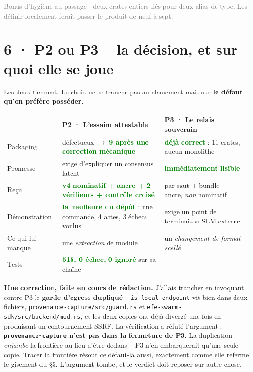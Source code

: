 \documentclass[10pt]{article}
\newcommand{\best}[1]{\textcolor{green}{\textbf{#1}}}
\newcommand{\sz}[1]{\textcolor{grey}{\small\textsf{#1}}}
\newcommand{\code}[1]{\texttt{\small #1}}
\begin{document}
\sz{Bonus d'hygiène au passage : deux crates entiers liés pour deux alias de type. Les définir
localement ferait passer le produit de neuf à sept.}

\section{6 · P2 ou P3 -- la décision, et sur quoi elle se joue}

Les deux tiennent. Le choix ne se tranche pas au classement mais sur \textbf{le défaut qu'on préfère
posséder}.

\renewcommand{\arraystretch}{1.2}
\begin{center}\small
\begin{tabular}{@{}>{\raggedright\arraybackslash}p{2.6cm} >{\raggedright\arraybackslash}p{6.4cm} >{\raggedright\arraybackslash}p{6.4cm}@{}}
\toprule
& \textbf{P2 · L'essaim attestable} & \textbf{P3 · Le relais souverain} \\
\midrule
Packaging & défectueux $\rightarrow$ \best{9 après une correction mécanique} & \best{déjà correct} : 11 crates, aucun monolithe \\
Promesse & exige d'expliquer un consensus latent & \best{immédiatement lisible} \\
Reçu & \best{v4 nominatif + ancre + 2 vérifieurs + contrôle croisé} & par saut + bundle + ancre, \emph{non} nominatif \\
Démonstration & \best{la meilleure du dépôt} : une commande, 4 actes, 3 échecs voulus & exige un point de terminaison SLM externe \\
Ce qui lui manque & une \emph{extraction} de module & un \emph{changement de format scellé} \\
Tests & \best{515, 0 échec, 0 ignoré} sur sa chaîne & --- \\
\bottomrule
\end{tabular}
\end{center}

\begin{alerte}
\textbf{Une correction, faite en cours de rédaction.} J'allais trancher en invoquant contre P3 le
\textbf{garde d'egress dupliqué} -- \code{is\_local\_endpoint} vit bien dans deux fichiers,
\code{provenance-capture/src/guard.rs} et \code{efe-swarm-sdk/src/backend/mod.rs}, et les deux copies
ont déjà divergé une fois en produisant un contournement SSRF. La vérification a réfuté l'argument :
\textbf{\code{provenance-capture} n'est pas dans la fermeture de P3}. La duplication \emph{enjambe} la
frontière au lieu d'être dedans -- P3 n'en embarquerait qu'une seule copie. Tracer la frontière
résout ce défaut-là aussi, exactement comme elle referme le gisement du §5. L'argument tombe, et le
verdict doit reposer sur autre chose.
\end{alerte}
\end{document}
